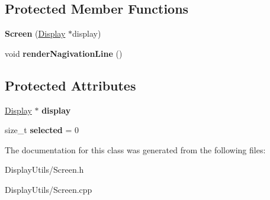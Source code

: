 \subsection*{Protected Member Functions}
\begin{DoxyCompactItemize}
\item 
{\bfseries Screen} (\hyperlink{classDisplay}{Display} $\ast$display)\hypertarget{classScreen_a596e7fffdfafd57fb5385c299863f31d}{}\label{classScreen_a596e7fffdfafd57fb5385c299863f31d}

\item 
void {\bfseries render\+Nagivation\+Line} ()\hypertarget{classScreen_a2f4dd14ae5816c033084b2e83f725afe}{}\label{classScreen_a2f4dd14ae5816c033084b2e83f725afe}

\end{DoxyCompactItemize}
\subsection*{Protected Attributes}
\begin{DoxyCompactItemize}
\item 
\hyperlink{classDisplay}{Display} $\ast$ {\bfseries display}\hypertarget{classScreen_aad713267725e8aa8a8def951a07de641}{}\label{classScreen_aad713267725e8aa8a8def951a07de641}

\item 
size\+\_\+t {\bfseries selected} = 0\hypertarget{classScreen_ae66538a4cf9fd681495f28acb12be732}{}\label{classScreen_ae66538a4cf9fd681495f28acb12be732}

\end{DoxyCompactItemize}


The documentation for this class was generated from the following files\+:\begin{DoxyCompactItemize}
\item 
Display\+Utils/Screen.\+h\item 
Display\+Utils/Screen.\+cpp\end{DoxyCompactItemize}
